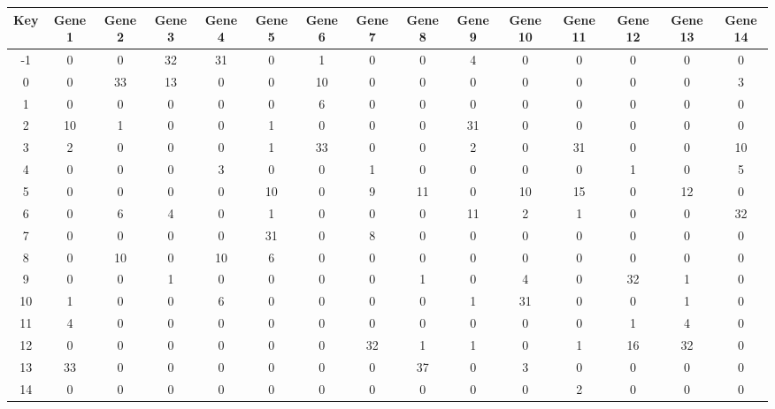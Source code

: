 \begin{tabular}{|c|c|c|c|c|c|c|c|c|c|c|c|c|c|c|}
\hline
Key & Gene 1 & Gene 2 & Gene 3 & Gene 4 & Gene 5 & Gene 6 & Gene 7 & Gene 8 & Gene 9 & Gene 10 & Gene 11 & Gene 12 & Gene 13 & Gene 14 \\
\hline
-1 & 0 & 0 & 32 & 31 & 0 & 1 & 0 & 0 & 4 & 0 & 0 & 0 & 0 & 0 \\
0 & 0 & 33 & 13 & 0 & 0 & 10 & 0 & 0 & 0 & 0 & 0 & 0 & 0 & 3 \\
1 & 0 & 0 & 0 & 0 & 0 & 6 & 0 & 0 & 0 & 0 & 0 & 0 & 0 & 0 \\
2 & 10 & 1 & 0 & 0 & 1 & 0 & 0 & 0 & 31 & 0 & 0 & 0 & 0 & 0 \\
3 & 2 & 0 & 0 & 0 & 1 & 33 & 0 & 0 & 2 & 0 & 31 & 0 & 0 & 10 \\
4 & 0 & 0 & 0 & 3 & 0 & 0 & 1 & 0 & 0 & 0 & 0 & 1 & 0 & 5 \\
5 & 0 & 0 & 0 & 0 & 10 & 0 & 9 & 11 & 0 & 10 & 15 & 0 & 12 & 0 \\
6 & 0 & 6 & 4 & 0 & 1 & 0 & 0 & 0 & 11 & 2 & 1 & 0 & 0 & 32 \\
7 & 0 & 0 & 0 & 0 & 31 & 0 & 8 & 0 & 0 & 0 & 0 & 0 & 0 & 0 \\
8 & 0 & 10 & 0 & 10 & 6 & 0 & 0 & 0 & 0 & 0 & 0 & 0 & 0 & 0 \\
9 & 0 & 0 & 1 & 0 & 0 & 0 & 0 & 1 & 0 & 4 & 0 & 32 & 1 & 0 \\
10 & 1 & 0 & 0 & 6 & 0 & 0 & 0 & 0 & 1 & 31 & 0 & 0 & 1 & 0 \\
11 & 4 & 0 & 0 & 0 & 0 & 0 & 0 & 0 & 0 & 0 & 0 & 1 & 4 & 0 \\
12 & 0 & 0 & 0 & 0 & 0 & 0 & 32 & 1 & 1 & 0 & 1 & 16 & 32 & 0 \\
13 & 33 & 0 & 0 & 0 & 0 & 0 & 0 & 37 & 0 & 3 & 0 & 0 & 0 & 0 \\
14 & 0 & 0 & 0 & 0 & 0 & 0 & 0 & 0 & 0 & 0 & 2 & 0 & 0 & 0 \\
\hline
\end{tabular}